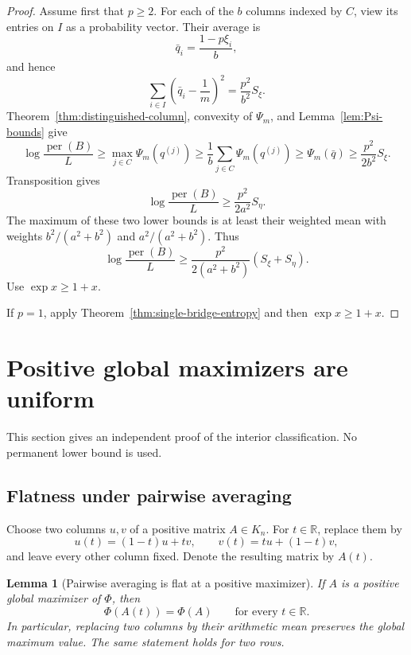 \documentclass[11pt,a4paper]{article}
\numberwithin{equation}{section}
\newtheorem{lemma}[theorem]{Lemma}
\theoremstyle{definition}
\newcommand{\per}{\operatorname{per}}
\newcommand{\1}{\mathbf{1}}
\begin{document}
\begin{proof}
Assume first that $p\ge2$.  For each of the $b$ columns indexed by $C$,
view its entries on $I$ as a probability vector.  Their average is
\[
 \bar q_i=\frac{1-p\xi_i}{b},
\]
and hence
\[
 \sum_{i\in I}\left(\bar q_i-\frac1m\right)^2
 =\frac{p^2}{b^2}S_\xi.
\]
Theorem~\ref{thm:distinguished-column}, convexity of $\Psi_m$, and
Lemma~\ref{lem:Psi-bounds} give
\[
 \log\frac{\per(B)}L
 \ge\max_{j\in C}\Psi_m(q^{(j)})
 \ge\frac1b\sum_{j\in C}\Psi_m(q^{(j)})
 \ge\Psi_m(\bar q)
 \ge\frac{p^2}{2b^2}S_\xi.
\]
Transposition gives
\[
 \log\frac{\per(B)}L\ge\frac{p^2}{2a^2}S_\eta.
\]
The maximum of these two lower bounds is at least their weighted mean with
weights $b^2/(a^2+b^2)$ and $a^2/(a^2+b^2)$.  Thus
\[
 \log\frac{\per(B)}L
 \ge\frac{p^2}{2(a^2+b^2)}(S_\xi+S_\eta).
\]
Use $\exp x\ge1+x$.

If $p=1$, apply Theorem~\ref{thm:single-bridge-entropy} and then
$\exp x\ge1+x$.
\end{proof}



\section{Positive global maximizers are uniform}\label{sec:positive}

This section gives an independent proof of the interior classification.  No permanent lower bound is used.

\subsection{Flatness under pairwise averaging}

Choose two columns $u,v$ of a positive matrix $A\in K_n$.  For $t\in\mathbb R$, replace them by
\begin{equation}\label{eq:pair-path}
 u(t)=(1-t)u+tv,
 \qquad
 v(t)=tu+(1-t)v,
\end{equation}
and leave every other column fixed.  Denote the resulting matrix by $A(t)$.

\begin{lemma}[Pairwise averaging is flat at a positive maximizer]\label{lem:flat-average}
If $A$ is a positive global maximizer of $\Phi$, then
\begin{equation}\label{eq:flat-path}
 \Phi(A(t))=\Phi(A)
 \qquad\text{for every }t\in\mathbb R.
\end{equation}
In particular, replacing two columns by their arithmetic mean preserves the global maximum value.  The same statement holds for two rows.
\end{lemma}
\end{document}

